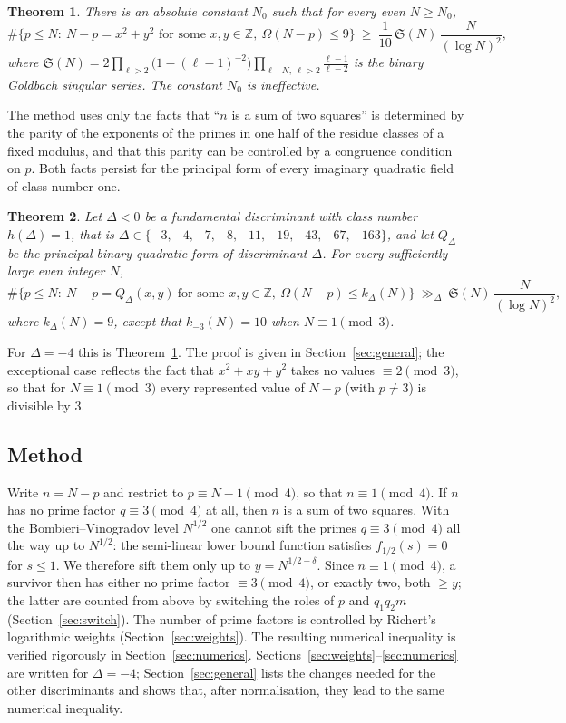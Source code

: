 \documentclass[11pt]{amsart}
\newtheorem{theorem}{Theorem}[section]
\theoremstyle{remark}
\newcommand{\Sg}{\mathfrak{S}}
\begin{document}
\begin{theorem}\label{thm:main}
There is an absolute constant $N_0$ such that for every even $N\ge N_0$,
\[
\#\{p\le N:\ N-p=x^2+y^2 \text{ for some } x,y\in\mathbb Z,\ \Omega(N-p)\le 9\}
\ \ge\ \frac{1}{10}\,\Sg(N)\,\frac{N}{(\log N)^2},
\]
where $\Sg(N)=2\prod_{\ell>2}\bigl(1-(\ell-1)^{-2}\bigr)\prod_{\ell\mid N,\ \ell>2}\frac{\ell-1}{\ell-2}$
is the binary Goldbach singular series. The constant $N_0$ is ineffective.
\end{theorem}

The method uses only the facts that ``$n$ is a sum of two squares'' is determined by the parity of the
exponents of the primes in one half of the residue classes of a fixed modulus, and that this parity can be
controlled by a congruence condition on $p$. Both facts persist for the principal form of every imaginary
quadratic field of class number one.

\begin{theorem}\label{thm:general}
Let $\Delta<0$ be a fundamental discriminant with class number $h(\Delta)=1$, that is
$\Delta\in\{-3,-4,-7,-8,-11,-19,-43,-67,-163\}$, and let $Q_\Delta$ be the principal binary quadratic form
of discriminant $\Delta$. For every sufficiently large even integer $N$,
\[
\#\{p\le N:\ N-p=Q_\Delta(x,y)\ \text{for some } x,y\in\mathbb Z,\ \Omega(N-p)\le k_\Delta(N)\}
\ \gg_\Delta\ \Sg(N)\,\frac{N}{(\log N)^2},
\]
where $k_\Delta(N)=9$, except that $k_{-3}(N)=10$ when $N\equiv 1\pmod 3$.
\end{theorem}

For $\Delta=-4$ this is Theorem~\ref{thm:main}. The proof is given in Section~\ref{sec:general}; the
exceptional case reflects the fact that $x^2+xy+y^2$ takes no values $\equiv 2\pmod 3$, so that for $N\equiv1\pmod 3$
every represented value of $N-p$ (with $p\ne 3$) is divisible by $3$.

\subsection*{Method}
Write $n=N-p$ and restrict to $p\equiv N-1\pmod 4$, so that $n\equiv 1\pmod 4$. If $n$ has no prime
factor $q\equiv 3\pmod 4$ at all, then $n$ is a sum of two squares. With the Bombieri--Vinogradov level
$N^{1/2}$ one cannot sift the primes $q\equiv3\pmod 4$ all the way up to $N^{1/2}$: the semi-linear
lower bound function satisfies $f_{1/2}(s)=0$ for $s\le 1$. We therefore sift them only up to
$y=N^{1/2-\delta}$. Since $n\equiv 1\pmod 4$, a survivor then has either no prime factor $\equiv 3\pmod 4$,
or exactly two, both $\ge y$; the latter are counted from above by switching the roles of $p$ and
$q_1q_2m$ (Section~\ref{sec:switch}). The number of prime factors is controlled by Richert's logarithmic
weights (Section~\ref{sec:weights}). The resulting numerical inequality is verified rigorously in
Section~\ref{sec:numerics}. Sections~\ref{sec:weights}--\ref{sec:numerics} are written for $\Delta=-4$;
Section~\ref{sec:general} lists the changes needed for the other discriminants and shows that, after
normalisation, they lead to the same numerical inequality.
\end{document}
